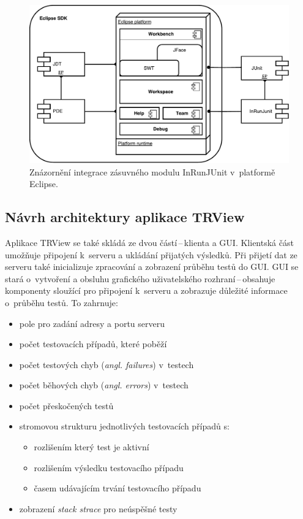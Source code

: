       \begin{figure}
	\includegraphics[width=\textwidth, center]{obrazky-figures/inrunjunit_eclipse_integration.pdf}
	\caption{Znázornění integrace zásuvného modulu InRunJUnit v~platformě Eclipse.}
	\label{fig:inrunjunit_eclipse_integration}
      \end{figure}

    \subsection{Návrh architektury aplikace TRView}
    Aplikace TRView se také skládá ze dvou částí\,--\,klienta a GUI. Klientská část umožňuje připojení k~serveru a ukládání přijatých výsledků. Při přijetí dat ze serveru také inicializuje zpracování a zobrazení průběhu testů do GUI. GUI se stará o~vytvoření a obsluhu grafického uživatelského rozhraní\,--\,obsahuje komponenty sloužící pro připojení k~serveru a zobrazuje důležité informace o~průběhu testů. To zahrnuje:
    \begin{itemize}
     \item pole pro zadání adresy a portu serveru
     \item počet testovacích případů, které poběží
     \item počet testových chyb (\emph{angl. failures}) v~testech
     \item počet běhových chyb (\emph{angl. errors}) v~testech
     \item počet přeskočených testů
     \item stromovou strukturu jednotlivých testovacích případů s:
     \begin{itemize}
      \item rozlišením který test je aktivní
      \item rozlišením výsledku testovacího případu
      \item časem udávajícím trvání testovacího případu
     \end{itemize}
     \item zobrazení \emph{stack strace} pro neúspěšné testy
    \end{itemize}

